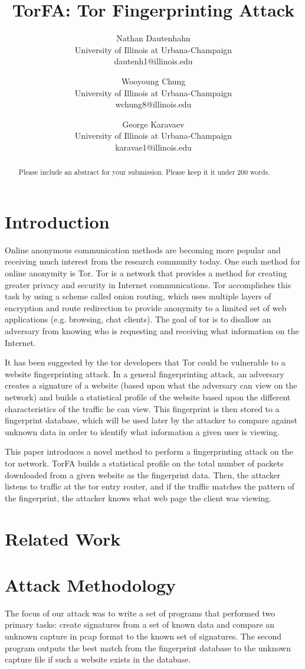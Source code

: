 \documentclass{usenixsubmit}
\title{TorFA: Tor Fingerprinting Attack}
\author{
Nathan Dautenhahn\\
University of Illinois at Urbana-Champaign\\
dautenh1@illinois.edu\\
\and
Wooyoung Chung\\
University of Illinois at Urbana-Champaign\\
wchung8@illinois.edu\\
\and
George Karavaev\\
University of Illinois at Urbana-Champaign\\
karavae1@illinois.edu\\
}
\date{}
\begin{document}
\maketitle


\begin{abstract}
Please include an abstract for your submission. Please keep it it
under 200 words.
\end{abstract}

\section{Introduction}
Online anonymous communication methods are becoming more popular and receiving 
much interest from the research community today. One such method for online 
anonymity is Tor. Tor is a network that provides a method for creating greater 
privacy and security in Internet communications. Tor accomplishes this task 
by using a scheme called onion routing, which uses multiple layers of encryption
and route redirection to provide anonymity to a limited set of web applications 
(e.g. browsing, chat clients). The goal of tor is to disallow an adversary from 
knowing who is requesting and receiving what information on the Internet. 

It has been suggested by the tor developers%
that Tor could be vulnerable to a website fingerprinting 
attack. In a general fingerprinting attack, an adversary creates a signature of 
a website (based upon what the adversary can view on the network) and builds a 
statistical profile of the website based upon the different characteristics 
of the traffic he can view. This fingerprint is then stored to a fingerprint 
database, which will be used later by the attacker to compare against unknown 
data in order to identify what information a given user is 
viewing. 

This paper introduces a novel method to perform a fingerprinting attack on the 
tor network. TorFA builds a statistical profile on the total number of 
packets downloaded from a given website as the fingerprint data. Then, the 
attacker listens to traffic at the tor entry router, and if the traffic matches 
the pattern of the fingerprint, the attacker knows what web page the client was 
viewing.

\section{Related Work}

\section{Attack Methodology}
The focus of our attack was to write a set of programs that performed 
two primary tasks: create signatures from a set of known data and compare 
an unknown capture in pcap format to the known set of signatures. The 
second program outputs the best match from the fingerprint database to 
the unknown capture file if such a website exists in the database. 
\end{document}
